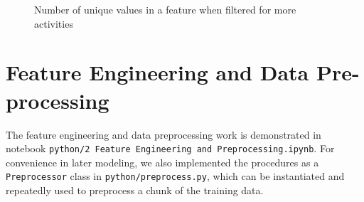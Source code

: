 \documentclass[12pt]{article}
\begin{document}
\begin{figure}[H]
    \centering
    \caption{Number of unique values in a feature when filtered for more activities}\label{fig:unique_values_with_more_activity}
\end{figure}


\section{Feature Engineering and Data Pre-processing}
The feature engineering  and data preprocessing work is demonstrated in notebook \texttt{python/2 Feature Engineering and Preprocessing.ipynb}. 
For convenience in later modeling, we also implemented the procedures as a \texttt{Preprocessor} class in \texttt{python/preprocess.py}, 
which can be instantiated and repeatedly used to preprocess a chunk of the training data.
\end{document}
